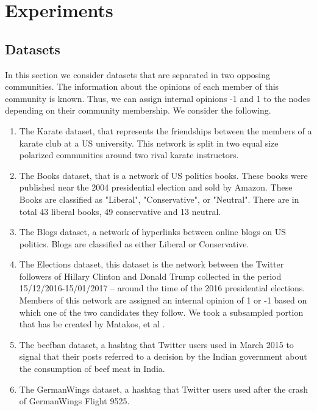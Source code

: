 \chapter{Experiments}
\label{ch:experiments}

\section{Datasets}
\label{sec:ds}

In this section we consider datasets that are separated in two opposing communities. The information about the opinions of each member of this community is known. Thus, we can assign internal opinions -1 and 1 to the nodes depending on their community membership\cite{tsapMatakosTerzi}.  We consider the following.

\begin{enumerate}

  \item The Karate dataset, that represents the friendships between the members of a karate club at a US university. This network is split in two equal size polarized communities around two rival karate instructors.
  
  \item The Books dataset, that is a network of US politics books. These books were published near the 2004 presidential election and sold by Amazon. These Books are classified as "Liberal", "Conservative", or "Neutral".  There are in total 43 liberal books, 49 conservative and 13 neutral.
  
  \item The Blogs dataset, a network of hyperlinks between online blogs on US politics. Blogs are classified as either Liberal or Conservative.
  
  \item The Elections dataset, this dataset is the network between the Twitter followers of Hillary Clinton and Donald Trump collected in the period 15/12/2016-15/01/2017 – around the time of the 2016 presidential elections. Members of this network are assigned an internal opinion of 1 or -1 based on which one of the two candidates they follow. We took a subsampled portion that has be created by Matakos, et al \cite{tsapMatakosTerzi}.
    
  \item The beefban dataset, a  hashtag that Twitter users used in March 2015 to signal that their posts referred to a decision by the Indian government about the consumption of beef meat in India.
  
  \item The GermanWings dataset, a  hashtag that Twitter users used after the crash of GermanWings Flight 9525.
  
\end{enumerate}

